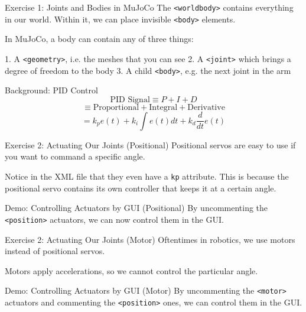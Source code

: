 \documentclass[14pt]{beamer}
\begin{document}
	\begin{frame}{Exercise 1: Joints and Bodies in MuJoCo}
		The \texttt{<worldbody>} contains everything in our world. Within it, we can place invisible \texttt{<body>} elements.
		
		\vspace{1cm}
		
		In MuJoCo, a body can contain any of three things:
		
		\vspace{1cm}
		
		1. A \texttt{<geometry>}, i.e. the meshes that you can see
		2. A \texttt{<joint>} which brings a degree of freedom to the body
		3. A child \texttt{<body>}, e.g. the next joint in the arm
	\end{frame}
	
	\begin{frame}{Background: PID Control}
		$$\text{PID Signal} \equiv P + I + D$$
		$$\equiv\text{Proportional}+\text{Integral}+\text{Derivative}$$
		$$ = k_p e(t) + k_i \int e(t)dt + k_d \frac{d}{dt}e(t)$$
	\end{frame}
	
	\begin{frame}{Exercise 2: Actuating Our Joints (Positional)}
		Positional servos are easy to use if you want to command a specific angle.
		
		Notice in the XML file that they even have a \texttt{kp} attribute. This is because the positional servo contains its own controller that keeps it at a certain angle.
	\end{frame}
	
	\begin{frame}{Demo: Controlling Actuators by GUI (Positional)}
		By uncommenting the \texttt{<position>} actuators, we can now control them in the GUI.
	\end{frame}
	
	\begin{frame}{Exercise 2: Actuating Our Joints (Motor)}
		Oftentimes in robotics, we use motors instead of positional servos.
		
		Motors apply accelerations, so we cannot control the particular angle.
	\end{frame}
	
	\begin{frame}{Demo: Controlling Actuators by GUI (Motor)}
		By uncommenting the \texttt{<motor>} actuators and commenting the \texttt{<position>} ones, we can control them in the GUI.
	\end{frame}
	
\end{document}
